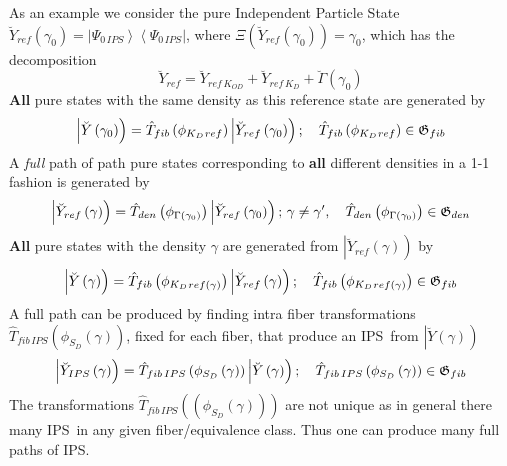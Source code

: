 As an example we consider the pure Independent Particle State $\breve{Y}%
_{ref}\left( \gamma _{0}\right) =\left| \Psi _{0\,IPS}\right\rangle
\left\langle \Psi _{0\,IPS}\right| $, where $\Xi \left( \breve{Y}%
_{ref}\left( \gamma _{0}\right) \right) =\gamma _{0}$, which has the
decomposition 
\begin{equation}
\breve{Y}_{ref}=\breve{Y}_{ref\,K_{OD}}+\breve{Y}_{ref\,K_{D}}+\breve{\Gamma}%
\left( \gamma _{0}\right)
\end{equation}%
{\bf All} pure states with the same density as this reference state are
generated by 
\begin{equation}
\left| \breve{Y}\left( \gamma _{0}\right) \right) =\hat{T}_{fib}\left( \phi
_{K_{D}}{}_{ref}\right) \left| \breve{Y}_{ref}\left( \gamma _{0}\right)
\right) ;\quad \hat{T}_{fib}\left( \phi _{K_{D}}{}_{ref}\right) \in {\frak G}%
_{fib}
\end{equation}%
A {\it full }path of path pure states corresponding to {\bf all} different
densities in a 1-1 fashion is generated by 
\begin{equation}
\left| \breve{Y}_{ref}\left( \gamma \right) \right) =\hat{T}_{den}\left(
\phi _{\Gamma \left( \gamma _{0}\right) }\right) \left| \breve{Y}%
_{ref}\left( \gamma _{0}\right) \right) ;\,\gamma \neq \gamma ^{\prime
},\quad \hat{T}_{den}\left( \phi _{\Gamma \left( \gamma _{0}\right) }\right)
\in {\frak G}_{den}
\end{equation}%
{\bf All }pure states with the density $\gamma $ are generated from $\left| 
\breve{Y}_{ref}\left( \gamma \right) \right) $ by%
\begin{equation}
\left| \breve{Y}\left( \gamma \right) \right) =\hat{T}_{fib}\left( \phi
_{K_{D}}{}_{ref\left( \gamma \right) }\right) \left| \breve{Y}_{ref}\left(
\gamma \right) \right) ;\quad \hat{T}_{fib}\left( \phi _{K_{D}}{}_{ref\left(
\gamma \right) }\right) \in {\frak G}_{fib}
\end{equation}%
A full path can be produced by finding intra fiber transformations $\hat{T}%
_{fib\,IPS}\left( \phi _{S_{D}}\left( \gamma \right) \right) $, fixed for
each fiber, that produce an IPS\ from $\left| \breve{Y}\left( \gamma \right)
\right) $ 
\begin{equation}
\left| \breve{Y}_{IPS}\left( \gamma \right) \right) =\hat{T}%
_{fib\,IPS}\left( \phi _{S_{D}}\left( \gamma \right) \right) \left| \breve{Y}%
\left( \gamma \right) \right) ;\quad \hat{T}_{fib\,IPS}\left( \phi
_{S_{D}}\left( \gamma \right) \right) \in {\frak G}_{fib}
\end{equation}%
The transformations $\hat{T}_{fib\,IPS}\left( \left( \phi _{S_{D}}\left(
\gamma \right) \right) \right) $ are not unique as in general there many
IPS\ in any given fiber/equivalence class. Thus one can produce many full
paths of IPS.

